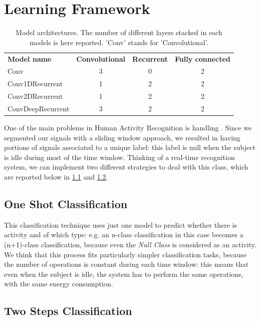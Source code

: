 \section{Learning Framework}
\label{sec:learning_framework}

\begin{table}[]
	\begin{tabular}{lccc}
		\textbf{Model name}        & \textbf{Convolutional} & \textbf{Recurrent} & \textbf{Fully connected} \\
		Conv              & 3             & 0         & 2			   \\
		Conv1DRecurrent   & 1             & 2         & 2               \\
		Conv2DRecurrent   & 1             & 2         & 2               \\
		ConvDeepRecurrent & 3             & 2         & 2
	\end{tabular}
	\caption{Model architectures. The number of different layers stacked in each models is here reported. 'Conv' stands for 'Convolutional'.}
	\label{tab:models}
\end{table}

One of the main problems in Human Activity Recognition is handling . Since we segmented our signals with a sliding window approach, we resulted in having portions of signals associated to a unique label: this label is null when the subject is idle during most of the time window. Thinking of a real-time recognition system, we can implement two different strategies to deal with this class, which are reported below in \ref{sub:oneshot} and \ref{sub:twosteps}.

\subsection{One Shot Classification}
\label{sub:oneshot}

This classification technique uses just one model to predict whether there is activity and of which type: e.g. an n-class classification in this case becomes a (n+1)-class classification, because even the \textit{Null Class} is considered as an activity. We think that this process fits particularly simpler classification tasks, because the number of operations is constant during each time window: this means that even when the subject is idle, the system has to perform the same operations, with the same energy consumption.

\subsection{Two Steps Classification}
\label{sub:twosteps}

